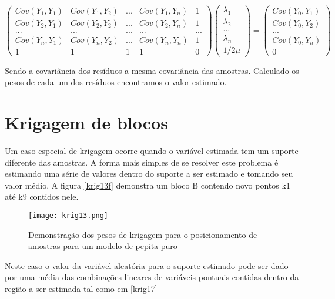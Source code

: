 \begin{equation}\label{krig16}
\begin{pmatrix}
Cov(Y_{1},Y_{1})&Cov(Y_{1},Y_{2})& ... & Cov(Y_{1},Y_{n})& 1\\ 
Cov(Y_{2},Y_{1})&Cov(Y_{2},Y_{2})& ... & Cov(Y_{2},Y_{n})& 1 \\ 
...&...& ...&... & ...\\
Cov(Y_{n},Y_{1})&Cov(Y_{n},Y_{2})& ... & Cov(Y_{n},Y_{n})& 1\\
1&1& 1&1& 0
\end{pmatrix} 
\begin{pmatrix}
\lambda _{1}\\ 
\lambda _{2}\\ 
...\\ 
\lambda _{n}\\
1/2\mu
\end{pmatrix}=\begin{pmatrix}
Cov(Y_{0}, Y_{1})\\ 
Cov(Y_{0}, Y_{2})\\  
...\\
Cov(Y_{0}, Y_{n})\\
0
\end{pmatrix}
\end{equation}

Sendo a covariância dos resíduos a mesma covariância das amostras. Calculado os pesos de cada um dos resíduos encontramos o valor estimado.

\section{Krigagem de blocos}

Um caso especial de krigagem ocorre quando o variável estimada tem um suporte diferente das amostras. A forma mais simples de se resolver este problema é estimando uma série de valores dentro do suporte a ser estimado e tomando seu valor médio. A figura \eqref{krig13f} demonstra um bloco B contendo novo pontos k1 até k9 contidos nele. 

\begin{figure}[H]
	\centering
	\texttt{[image: krig13.png]}
	\caption{Demonstração dos pesos de krigagem para o posicionamento de amostras para um modelo de pepita puro}
	\label{krig13f}
\end{figure}

Neste caso o valor da variável aleatória para o suporte estimado pode ser dado por uma média das combinações lineares de variáveis pontuais contidas dentro da região a ser estimada tal como em \eqref{krig17}

